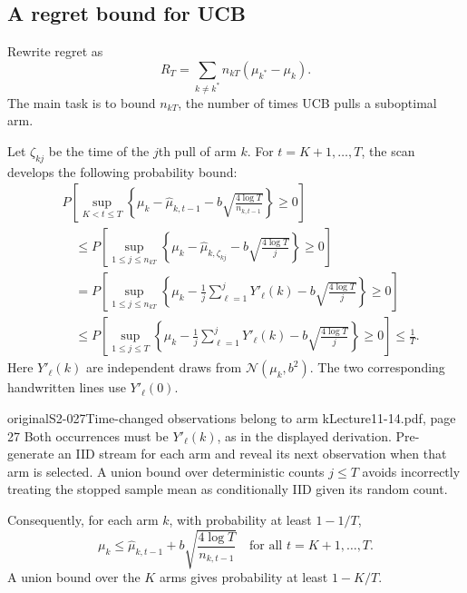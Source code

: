 \subsection{A regret bound for UCB}
Rewrite regret as
\[
 R_T=\sum_{k\ne k^*}n_{kT}(\mu_{k^*}-\mu_k).
\]
The main task is to bound $n_{kT}$, the number of times UCB pulls a suboptimal arm. 

Let $\zeta_{kj}$ be the time of the $j$th pull of arm $k$. For $t=K+1,\ldots,T$, the scan develops the following probability bound:
\begin{align*}
 &P\left[\sup_{K<t\le T}\left\{
 \mu_k-\widehat\mu_{k,t-1}
 -b\sqrt{\frac{4\log T}{n_{k,t-1}}}\right\}\ge0\right]\\
 &\quad\le P\left[\sup_{1\le j\le n_{kT}}\left\{
 \mu_k-\widehat\mu_{k,\zeta_{kj}}
 -b\sqrt{\frac{4\log T}{j}}\right\}\ge0\right]\\
 &\quad=P\left[\sup_{1\le j\le n_{kT}}\left\{
 \mu_k-\frac1j\sum_{\ell=1}^jY'_\ell(k)
 -b\sqrt{\frac{4\log T}{j}}\right\}\ge0\right]\\
 &\quad\le P\left[\sup_{1\le j\le T}\left\{
 \mu_k-\frac1j\sum_{\ell=1}^jY'_\ell(k)
 -b\sqrt{\frac{4\log T}{j}}\right\}\ge0\right]
 \le\frac1T.
\end{align*}
Here $Y'_\ell(k)$ are independent draws from $\mathcal N(\mu_k,b^2)$. 
The two corresponding handwritten lines use $Y'_\ell(0)$.
\begin{reviewnote}{original}{S2-027}{Time-changed observations belong to arm k}{Lecture11-14.pdf, page 27}
Both occurrences must be $Y'_\ell(k)$, as in the displayed derivation. Pre-generate an IID stream for each arm and reveal its next observation when that arm is selected. A union bound over deterministic counts $j\le T$ avoids incorrectly treating the stopped sample mean as conditionally IID given its random count.
\end{reviewnote}


Consequently, for each arm $k$, with probability at least $1-1/T$,
\[
 \mu_k\le\widehat\mu_{k,t-1}
 +b\sqrt{\frac{4\log T}{n_{k,t-1}}}
 \quad\text{for all }t=K+1,\ldots,T.\tag{14.8}
\]
A union bound over the $K$ arms gives probability at least $1-K/T$.

